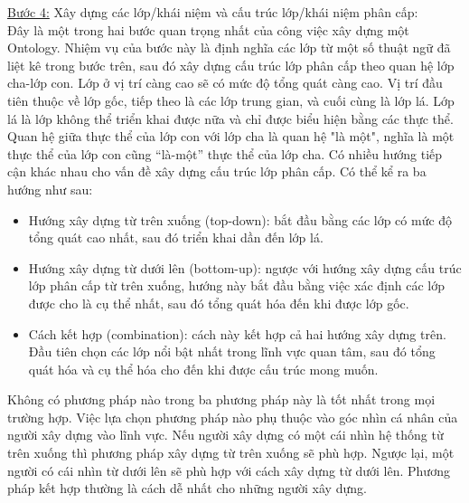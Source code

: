 \underline{Bước 4:} Xây dựng các lớp/khái niệm và cấu trúc lớp/khái niệm phân cấp:\\
Đây là một trong hai bước quan trọng nhất của công việc xây dựng một Ontology. Nhiệm vụ của bước này là định nghĩa các lớp từ một số thuật ngữ đã liệt kê trong bước trên, sau đó xây dựng cấu trúc lớp phân cấp theo quan hệ lớp cha-lớp con. Lớp ở vị trí càng cao sẽ có mức độ tổng quát càng cao. Vị trí đầu tiên thuộc về lớp gốc, tiếp theo là các lớp trung gian, và cuối cùng là lớp lá. Lớp lá là lớp không thể triển khai được nữa và chỉ được biểu hiện bằng các thực thể. Quan hệ giữa thực thể của lớp con với lớp cha là quan hệ "là một", nghĩa là một thực thể của lớp con cũng “là-một” thực thể của lớp cha. Có nhiều hướng tiếp cận khác nhau cho vấn đề xây dựng cấu trúc lớp phân cấp. Có thể kể ra ba hướng như sau: 
\begin{itemize}
	\item Hướng xây dựng từ trên xuống (top-down): bắt đầu bằng các lớp có mức độ tổng quát cao nhất, sau đó triển khai dần đến lớp lá.
	\item Hướng xây dựng từ dưới lên (bottom-up): ngược với hướng xây dựng cấu trúc lớp phân cấp từ trên xuống, hướng này bắt đầu bằng việc xác định các lớp được cho là cụ thể nhất, sau đó tổng quát hóa đến khi được lớp gốc.
	\item Cách kết hợp (combination): cách này kết hợp cả hai hướng xây dựng trên. Đầu tiên chọn các lớp nổi bật nhất trong lĩnh vực quan tâm, sau đó tổng quát hóa và cụ thể hóa cho đến khi được cấu trúc mong muốn.
\end{itemize}

Không có phương pháp nào trong ba phương pháp này là tốt nhất trong mọi trường hợp. Việc lựa chọn phương pháp nào phụ thuộc vào góc nhìn cá nhân của người xây dựng vào lĩnh vực. Nếu người xây dựng có một cái nhìn hệ thống từ trên xuống thì phương pháp xây dựng từ trên xuống sẽ phù hợp. Ngược lại, một người có cái nhìn từ dưới lên sẽ phù hợp với cách xây dựng từ dưới lên. Phương pháp kết hợp thường là cách dễ nhất cho những người xây dựng. 

